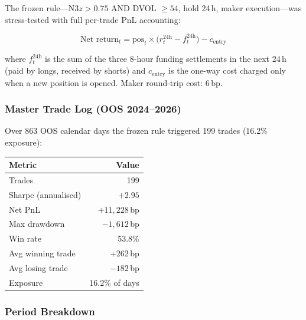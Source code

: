 \documentclass[12pt, a4paper]{article}
\theoremstyle{definition}
\begin{document}
The frozen rule---N3$z > 0.75$ AND DVOL $\geq 54$, hold 24\,h, maker
execution---was stress-tested with full per-trade PnL accounting:

\begin{equation*}
  \text{Net return}_t = \text{pos}_t \times
    \bigl(r^{24\text{h}}_t - f^{24\text{h}}_t\bigr) - c_{\text{entry}}
\end{equation*}

where $f^{24\text{h}}_t$ is the sum of the three 8-hour funding settlements
in the next 24\,h (paid by longs, received by shorts) and $c_{\text{entry}}$
is the one-way cost charged only when a new position is opened.
Maker round-trip cost: 6\,bp.

\subsubsection*{Master Trade Log (OOS 2024--2026)}

Over 863 OOS calendar days the frozen rule triggered 199 trades
(16.2\% exposure):

\begin{center}
\begin{tabular}{lr}
\hline
Metric & Value \\
\hline
Trades & 199 \\
Sharpe (annualised) & $+2.95$ \\
Net PnL & $+11{,}228$\,bp \\
Max drawdown & $-1{,}612$\,bp \\
Win rate & 53.8\% \\
Avg winning trade & $+262$\,bp \\
Avg losing trade & $-182$\,bp \\
Exposure & 16.2\% of days \\
\hline
\end{tabular}
\end{center}

\subsubsection*{Period Breakdown}
\end{document}
